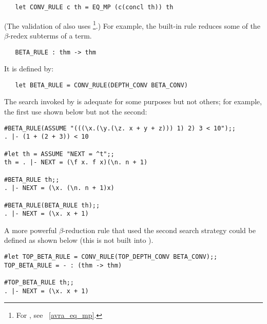 \begin{hol}\begin{verbatim}
   let CONV_RULE c th = EQ_MP (c(concl th)) th
\end{verbatim}\end{hol}

\noindent (The validation of  also
uses \footnote{For , see ~\ref{avra_eq_mp}.}.)
For example, the built-in rule  reduces some
of the $\beta$-redex subterms of a term.

\begin{boxed}
\begin{verbatim}
   BETA_RULE : thm -> thm
\end{verbatim}\end{boxed}

\noindent It is defined by:

\begin{hol}\begin{verbatim}
   let BETA_RULE = CONV_RULE(DEPTH_CONV BETA_CONV)
\end{verbatim}\end{hol}

\noindent The search invoked by 
is adequate for some purposes but not others; for example,
the first use shown below but not the second:

\begin{session}\begin{verbatim}
#BETA_RULE(ASSUME "(((\x.(\y.(\z. x + y + z))) 1) 2) 3 < 10");;
. |- (1 + (2 + 3)) < 10

#let th = ASSUME "NEXT = ^t";;
th = . |- NEXT = (\f x. f x)(\n. n + 1)

#BETA_RULE th;;
. |- NEXT = (\x. (\n. n + 1)x)

#BETA_RULE(BETA_RULE th);;
. |- NEXT = (\x. x + 1)
\end{verbatim}\end{session}

\noindent A more powerful
$\beta$-reduction rule
that used the second  search strategy could be defined as shown below
(this is not built into \HOL).

\begin{session}\begin{verbatim}
#let TOP_BETA_RULE = CONV_RULE(TOP_DEPTH_CONV BETA_CONV);;
TOP_BETA_RULE = - : (thm -> thm)

#TOP_BETA_RULE th;;
. |- NEXT = (\x. x + 1)
\end{verbatim}\end{session}

